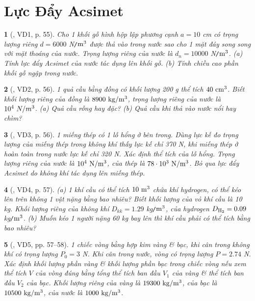 \documentclass{article}
\newtheorem{baitoan}{}
\begin{document}

\section{Lực Đẩy Acsimet}


\begin{baitoan}[\cite{Van_Quyen_Hanh_Nhu_10_chuyen_Ly}, VD1, p. 55]
	Cho 1 khối gỗ hình hộp lập phương cạnh $a = 10$ {\rm cm} có trọng lượng riêng $d = 6000$ {\rm N{\tt/}$\rm m^3$} được thả vào trong nước sao cho 1 mặt đáy song song với mặt thoáng của nước. Trọng lượng riêng của nước là $d_n = 10000$ {\rm N{\tt/}$\rm m^3$}. (a) Tính lực đẩy Acsimet của nước tác dụng lên khối gỗ. (b) Tính chiều cao phần khối gỗ ngập trong nước.
\end{baitoan}

\begin{baitoan}[\cite{Van_Quyen_Hanh_Nhu_10_chuyen_Ly}, VD2, p. 56]
	1 quả cầu bằng đồng có khối lượng {\rm200 g} thể tích $\rm40\ cm^3$. Biết khối lượng riêng của đồng là $\rm8900\ kg{\tt/}m^3$, trọng lượng riêng của nước là $10^4\ N{\tt/}m^3$. (a) Quả cầu rỗng hay đặc? (b) Quả cầu khi thả vào nước nổi hay chìm?
\end{baitoan}

\begin{baitoan}[\cite{Van_Quyen_Hanh_Nhu_10_chuyen_Ly}, VD3, p. 56]
	1 miếng thép có 1 lỗ hổng ở bên trong. Dùng lực kế đo trọng lượng của miếng thép trong không khí thấy lực kế chỉ {\rm370 N}, khi miếng thép ở hoàn toàn trong nước lực kế chỉ {\rm320 N}. Xác định thể tích của lỗ hổng. Trọng lượng riêng của nước là $\rm10^4\ N{\tt/}m^3$, của thép là $\rm78\cdot 10^3\ N{\tt/}m^3$. Bỏ qua lực đẩy Acsimet do không khí tác dụng lên miếng thép.
\end{baitoan}

\begin{baitoan}[\cite{Van_Quyen_Hanh_Nhu_10_chuyen_Ly}, VD4, p. 57]
	(a) 1 khí cầu có thể tích $\rm10\ m^3$ chứa khí hydrogen, có thể kéo lên trên không 1 vật nặng bằng bao nhiêu? Biết khối lượng của vỏ khí cầu là {\rm10 kg}. Khối lượng riêng của không khí $D_{kk} = 1.29$ {\rm kg{\tt/}$\rm m^3$}, của hydrogen $D_{\rm H_2} = 0.09$ {\rm kg{\tt/}$\rm m^3$}. (b) Muốn kéo 1 người nặng {\rm60 kg} bay lên thì khí cầu phải có thể tích bằng bao nhiêu?
\end{baitoan}

\begin{baitoan}[\cite{Van_Quyen_Hanh_Nhu_10_chuyen_Ly}, VD5, pp. 57--58]
	1 chiếc vòng bằng hợp kim vàng \& bạc, khi cân trong không khí có trọng lượng $P_0 = 3$ {\rm N}. Khi cân trong nước, vòng có trọng lượng $P = 2.74$ {\rm N}. Xác định khối lượng phần vàng \& khối lượng phần bạc trong chiếc vòng nếu xem thể tích $V$ của vòng đúng bằng tổng thể tích ban đầu $V_1$ của vàng \& thể tích ban đầu $V_2$ của bạc. Khối lượng riêng của vàng là $\rm19300\ kg{\tt/}m^3$, của bạc là $\rm10500\ kg{\tt/}m^3$, của nước là $\rm1000\ kg{\tt/}m^3$.
\end{baitoan}
\end{document}
